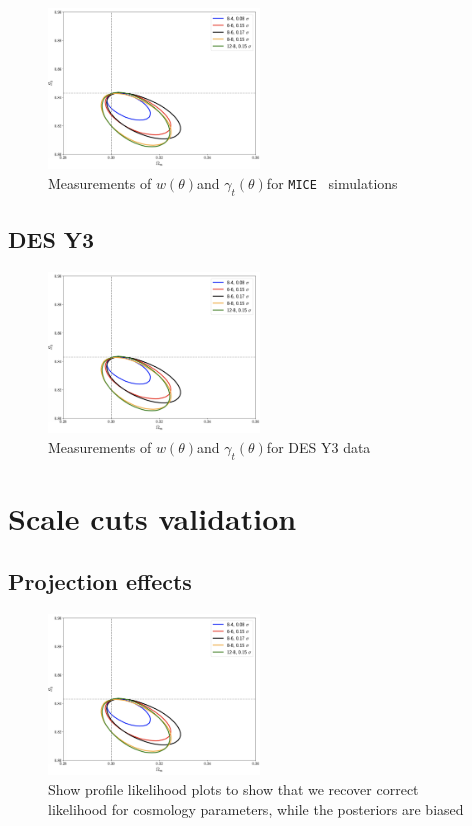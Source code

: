 \documentclass[fleqn,usenatbib]{mnras}
\newcommand{\gammat}{\ensuremath{\gamma_{t}(\theta)}}
\newcommand{\wtheta}{\ensuremath{w(\theta)}}
\newcommand{\mice}{\texttt{MICE} }
\begin{document}
\begin{figure}
\includegraphics[width=0.5\textwidth,draft]{figs/temp.png}
\caption[]{Measurements of \wtheta and \gammat for \mice \  simulations }
\label{fig:mice_2pt}
\end{figure}

\subsection{DES Y3}
\begin{figure}
\includegraphics[width=0.5\textwidth,draft]{figs/temp.png}
\caption[]{Measurements of \wtheta and \gammat for DES Y3 data }
\label{fig:data_2pt}
\end{figure}

\section{Scale cuts validation}\label{app:scale_cuts}
\subsection{Projection effects}\label{app:projection_effects}

\begin{figure}
\includegraphics[width=0.5\textwidth,draft]{figs/temp.png}
\caption[]{Show profile likelihood plots to show that we recover correct likelihood for cosmology parameters, while the posteriors are biased}
\label{fig:prof_like}
\end{figure}
\end{document}
